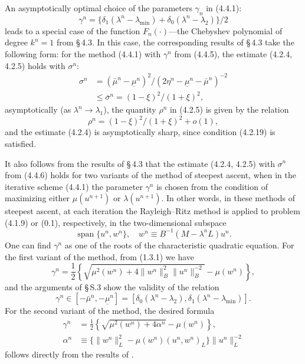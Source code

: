 \documentclass[11pt,oneside]{book}
\newcommand{\myspan}{\operatorname{span}}
\begin{document}
An asymptotically optimal choice of the parameters $\gamma_n$ in (4.4.1): %
\[
\gamma^n = \bigl\{\delta_1(\lambda^n - \lambda_{\min}) + \delta_0(\lambda^n - \lambda_2)\bigr\}/2 \tag{4.4.5}
\]
leads to a special case of the function $F_n(\cdot)$---the Chebyshev polynomial of degree $k^n = 1$ from \S\,4.3. In this case, the corresponding results of \S\,4.3 take the following form: for the method (4.4.1) with $\gamma^n$ from (4.4.5), the estimate (4.2.4, 4.2.5) holds with $\sigma^n$:
\[
\begin{aligned}
\sigma^n &= (\bar{\mu}^n - \underline{\mu}^n)^2 / (2\eta^n - \underline{\mu}^n - \bar{\mu}^n)^{-2} \\ %
&\leqslant \bar{\sigma}^n = (1 - \xi)^2 / (1 + \xi)^2,
\end{aligned} \tag{4.4.6}
\]
asymptotically (as $\lambda^n \to \lambda_1$), the quantity $\rho^n$ in (4.2.5) is given by the relation
\[
\rho^n = (1 - \xi)^2 / (1 + \xi)^2 + o(1), \tag{4.4.7}
\]
and the estimate (4.2.4) is asymptotically sharp, since condition (4.2.19) is satisfied.

It also follows from the results of \S\,4.3 that the estimate (4.2.4, 4.2.5) with $\sigma^n$ from (4.4.6) holds for two variants of the method of steepest ascent, when in the iterative scheme (4.4.1) the parameter $\gamma^n$ is chosen from the condition of maximizing either $\mu(u^{n+1})$ or $\lambda(u^{n+1})$. In other words, in these methods of steepest ascent, at each iteration the Rayleigh--Ritz method is applied to problem (4.1.9) or (0.1), respectively, in the two-dimensional subspace
\[
\myspan\{u^n, w^n\}, \quad w^n \equiv B^{-1}(M - \lambda^n L)u^n.
\]
One can find $\gamma^n$ as one of the roots of the characteristic quadratic equation. For the first variant of the method, from (1.3.1) we have
\[
\gamma^n = \frac{1}{2}\left\{\sqrt{\mu^2(w^n) + 4\|w^n\|_B^2 \|u^n\|_B^{-2}} - \mu(w^n)\right\}, \tag{4.4.8}
\]
and the arguments of \S\,S.3 show the validity of the relation
\[
\gamma^n \in [-\bar{\mu}^n, -\underline{\mu}^n] = [\delta_0(\lambda^n - \lambda_2), \delta_1(\lambda^n - \lambda_{\min})].
\]
For the second variant of the method, the desired formula
\[
\begin{aligned}
\gamma^n &= \frac{1}{2}\left\{\sqrt{\mu^2(w^n) + 4\alpha^n} - \mu(w^n)\right\}, \\
\alpha^n &\equiv \bigl\{\|w^n\|_L^2 - \mu(w^n)(u^n, w^n)_L\bigr\} \|u^n\|_L^{-2}
\end{aligned} \tag{4.4.9}
\]
follows directly from the results of \citep{Samokish1958,Petryshyn1968}.
\end{document}
